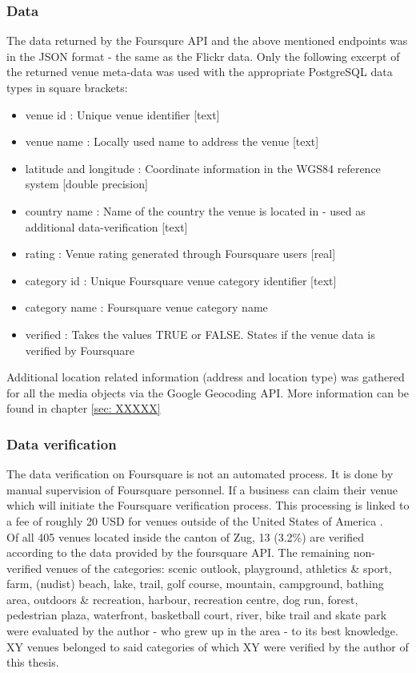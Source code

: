 \subsubsection{Data} \label{fq_data}
The data returned by the Foursqure API and the above mentioned endpoints was in the JSON format - the same as the Flickr data.
Only the following excerpt of the returned venue meta-data was used with the appropriate PostgreSQL data types in square brackets: \\
\begin{itemize}
    \item venue id : Unique venue identifier [text]
    \item venue name : Locally used name to address the venue [text]
    \item latitude and longitude : Coordinate information in the WGS84 reference system [double precision]
    \item country name : Name of the country the venue is located in - used as additional data-verification [text]
    \item rating : Venue rating generated through Foursquare users [real]
    \item category id : Unique Foursquare venue category identifier [text]
    \item category name : Foursquare venue category name
    \item verified : Takes the values TRUE or FALSE. States if the venue data is verified by Foursquare
\end{itemize}

Additional location related information (address and location type) was gathered for all the media objects via the Google Geocoding API. More information can be found in chapter \ref{sec: XXXXX}

\subsubsection{Data verification} \label{foursquare_data_verification}
The data verification on Foursquare is not an automated process. It is done by manual supervision of Foursquare personnel. If a business can claim their venue which will initiate the Foursquare verification process. This processing is linked to a fee of roughly 20 USD for venues outside of the United States of America \parencite{Foursquare2019}. \\
Of all 405 venues located inside the canton of Zug, 13 (3.2\%) are verified according to the data provided by the foursquare API. The remaining non-verified venues of the categories: scenic outlook, playground, athletics \& sport, farm, (nudist) beach, lake, trail, golf course, mountain, campground, bathing area, outdoors \& recreation, harbour, recreation centre, dog run, forest, pedestrian plaza, waterfront, basketball court, river, bike trail and skate park were evaluated by the author - who grew up in the area - to its best knowledge. XY venues belonged to said categories of which XY were verified by the author of this thesis.

